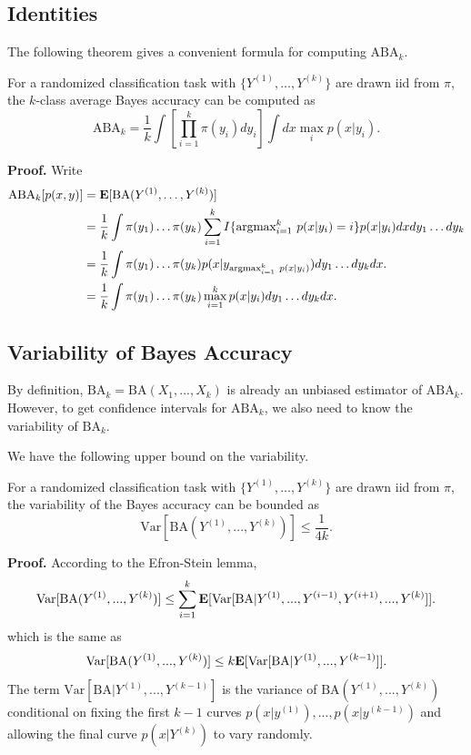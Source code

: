 \subsection{Identities}

The following theorem gives a convenient formula for computing $\text{ABA}_k$.

\begin{theorem}
For a randomized classification task with $\{Y^{(1)},\hdots,
Y^{(k)}\}$ are drawn iid from $\pi$, the $k$-class average Bayes
accuracy can be computed as
\[
\text{ABA}_k = \frac{1}{k} \int \left[\prod_{i=1}^k \pi(y_i) dy_i \right] \int dx \max_i p(x|y_i).
\]
\end{theorem}

\noindent\textbf{Proof.}
Write
\begin{align*}
\text{ABA}_k[p(x, y)] &=  \textbf{E}[\text{BA}(Y^{(1)},\hdots, Y^{(k)})]
\\&= \frac{1}{k}\int \pi(y_1)\hdots \pi(y_k)   \sum_{i=1}^k  I\{\text{argmax}_{i=1}^k\ p(x|y_i) = i\} p(x|y_i) dx dy_1\hdots dy_k
\\&=  \frac{1}{k} \int \pi(y_1)\hdots \pi(y_k) p(x|y_{\text{argmax}_{i=1}^k\ p(x|y_i)})  dy_1\hdots dy_k dx.
\\&=  \frac{1}{k} \int \pi(y_1)\hdots \pi(y_k) \max_{i=1}^k p(x|y_i)  dy_1\hdots dy_k dx.
\end{align*}

\subsection{Variability of Bayes Accuracy}

By definition, $\text{BA}_k = \text{BA}(X_1,...,X_k)$ is already an
unbiased estimator of $\text{ABA}_k$.  However, to get confidence
intervals for $\text{ABA}_k$, we also need to know the variability of
$\text{BA}_k$.

We have the following upper bound on the variability.

\begin{theorem}\label{thm:aba_var}
For a randomized classification task with $\{Y^{(1)},\hdots,
Y^{(k)}\}$ are drawn iid from $\pi$, the variability of the Bayes
accuracy can be bounded as
\[
\text{Var}[\text{BA}(Y^{(1)},...,Y^{(k)})] \leq \frac{1}{4k}.
\]
\end{theorem}

\noindent\textbf{Proof.}
According to the Efron-Stein lemma,
\[
\text{Var}[\text{BA}(Y^{(1)},...,Y^{(k)})] \leq \sum_{i=1}^k \textbf{E}[\text{Var}[\text{BA}|Y^{(1)},...,Y^{(i-1)}, Y^{(i+1)}, ..., Y^{(k)}]].
\]
which is the same as
\[
\text{Var}[\text{BA}(Y^{(1)},...,Y^{(k)})] \leq k \textbf{E}[\text{Var}[\text{BA}|Y^{(1)},...,Y^{(k-1)}]].
\]
The term $\text{Var}[\text{BA}|Y^{(1)},...,Y^{(k-1)}]$ is the variance
of $\text{BA}(Y^{(1)},...,Y^{(k)})$ conditional on fixing the first
$k-1$ curves $p(x|y^{(1)}),...,p(x|y^{(k-1)})$ and allowing the final
curve $p(x|Y^{(k)})$ to vary randomly.

